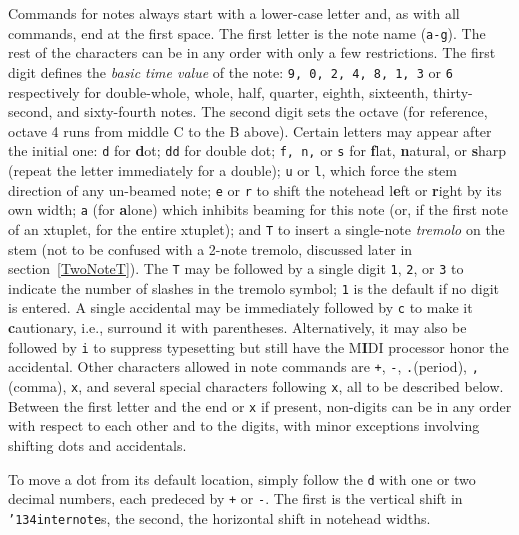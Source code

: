 \documentclass[11pt]{article}
\def\bs{{\tt\char'134}}
\def\newfrom{2.59}  %
\def\NEW#1{\ifdim#1 pt<\newfrom pt\else%
\marginpar{\fbox{#1}}\fi}
\begin{document}
	Commands for notes always start with a lower-case letter and, as 
with all commands, end at 
the first space. The first letter is the note name ({\tt a-g}).  The 
rest of the characters can be in any order with only a few 
restrictions.  The first digit defines the {\it basic time value} of the 
note: {\tt 9, 0, 2, 4, 8, 1, 3} or {\tt 6} respectively for double-whole,
whole, half, quarter, 
eighth, sixteenth, thirty-second, and sixty-fourth notes.  The second 
digit sets the octave (for reference, octave 4 runs from middle C to 
the B above).  Certain letters may appear after the initial one: {\tt d} 
for {\bf d}ot; {\tt dd} for \NEW{1.4} double dot; 
{\tt f, n,} or {\tt s} for {\bf f}lat, {\bf n}atural, 
or {\bf s}harp (repeat the letter  
immediately for a double); {\tt u} or {\tt l}, which  force the stem 
direction of any un-beamed note; {\tt e} or {\tt r} to shift the notehead 
l{\bf e}ft 
or {\bf r}ight by its own width; {\tt a} (for {\bf a}lone) which inhibits 
beaming for this note (or, if the first note of an xtuplet, for the
entire xtuplet); and \NEW{2.80}{\tt T} to insert a single-note {\it tremolo} 
on the stem (not to be confused with a 2-note tremolo, discussed later in 
section~\ref{TwoNoteT}). 
The {\tt T} may be followed by a single digit {\tt 1}, {\tt 2}, or {\tt 3} 
to indicate the
number of slashes in the tremolo symbol; {\tt 1} is the default if no digit
is entered. \NEW{2.4}A single accidental may be immediately 
followed by {\tt c} to
make it {\bf c}autionary, i.e., surround it with parentheses.
Alternatively, it may also be followed by {\tt i} to 
suppress typesetting \NEW{2.3} but still have 
the M{\bf I}DI processor honor the accidental.  Other characters allowed in note 
commands are {\tt +}, {\tt -}, {\tt .}(period), {\tt ,}(comma), {\tt x}, and 
several special characters following {\tt x}, all to be described below.  
Between the first letter and the end or {\tt x} if present,
non-digits can be in any order with respect to each other and to the digits, 
with minor exceptions involving shifting dots and accidentals.  

To move
a dot from its default location, simply follow the {\tt d}
with one or two decimal numbers, each predeced by 
{\tt +} or {\tt -}.  
The first is the 
vertical shift in \bs{\tt internote}s, the second, the horizontal shift in 
notehead widths.  
\end{document}
